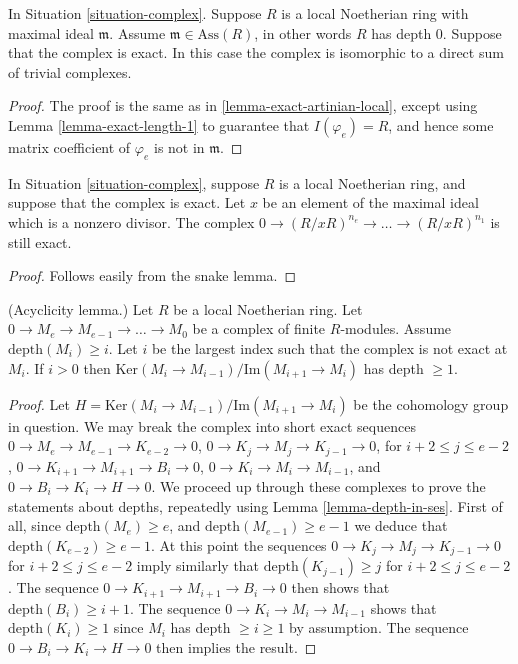 \begin{lemma}
\label{lemma-exact-depth-zero-local}
In Situation \ref{situation-complex}. Suppose $R$ is
a local Noetherian ring with maximal ideal $\mathfrak m$.
Assume $\mathfrak m \in \text{Ass}(R)$, in other words
$R$ has depth $0$. Suppose that the complex is exact.
In this case the complex is isomorphic to a direct sum of trivial
complexes.
\end{lemma}

\begin{proof}
The proof is the same as in \ref{lemma-exact-artinian-local},
except using Lemma \ref{lemma-exact-length-1} to guarantee
that $I(\varphi_e) = R$, and hence some matrix coefficient
of $\varphi_e$ is not in $\mathfrak m$.
\end{proof}

\begin{lemma}
\label{lemma-div-x-exact-one-less}
In Situation \ref{situation-complex}, suppose $R$ is
a local Noetherian ring, and suppose that the complex
is exact. Let $x$ be an element of the maximal ideal
which is a nonzero divisor. The complex
$0 \to (R/xR)^{n_e} \to \ldots \to (R/xR)^{n_1}$
is still exact.
\end{lemma}

\begin{proof}
Follows easily from the snake lemma.
\end{proof}

\begin{lemma}
\label{lemma-acyclic}
(Acyclicity lemma.)
Let $R$ be a local Noetherian ring.
Let $0 \to M_e \to M_{e-1} \to \ldots \to M_0$
be a complex of finite $R$-modules. 
Assume $\text{depth}(M_i) \geq i$.
Let $i$ be the largest index such that the complex is
not exact at $M_i$. If $i > 0$ then
$\text{Ker}(M_i \to M_{i-1})/\text{Im}(M_{i+1} \to M_i)$
has depth $\geq 1$.
\end{lemma}

\begin{proof}
Let $H = \text{Ker}(M_i \to M_{i-1})/\text{Im}(M_{i+1} \to M_i)$ be the 
cohomology group in question.
We may break the complex into short exact sequences
$0 \to M_e \to M_{e-1} \to K_{e-2} \to 0$,
$0 \to K_j \to M_j \to K_{j-1} \to 0$, for $i+2 \leq j \leq e-2 $,
$0 \to K_{i+1} \to M_{i+1} \to B_i \to 0$,
$0 \to K_i \to M_i \to M_{i-1}$, and
$0 \to B_i \to K_i \to H \to 0$.
We proceed up through these complexes to
prove the statements about depths, repeatedly using
Lemma \ref{lemma-depth-in-ses}.
First of all, since $\text{depth}(M_e) \geq e$,
and $\text{depth}(M_{e-1}) \geq e-1$ we deduce
that $\text{depth}(K_{e-2}) \geq e - 1$. At this point the
sequences $0 \to K_j \to M_j \to K_{j-1} \to 0$ for $i+2 \leq j \leq e-2 $
imply similarly that $\text{depth}(K_{j-1}) \geq j$ for
$i+2 \leq j \leq e-2$. The sequence $0 \to K_{i+1} \to M_{i+1} \to B_i \to 0$
then shows that $\text{depth}(B_i) \geq i+1$. The sequence
$0 \to K_i \to M_i \to M_{i-1}$ shows that $\text{depth}(K_i) \geq 1$
since $M_i$ has depth $\geq i \geq 1$ by assumption.
The sequence $0 \to B_i \to K_i \to H \to 0$ then
implies the result.
\end{proof}

